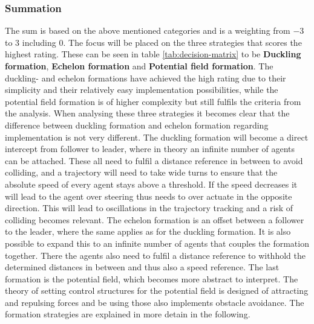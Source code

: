 \subsubsection{Summation}
The sum is based on the above mentioned categories and is a weighting from $-3$ to $3$ including $0$. The focus will be placed on the three strategies that scores the highest rating. These can be seen in table \ref{tab:decision-matrix} to be \textbf{Duckling formation}, \textbf{Echelon formation} and \textbf{Potential field formation}. The duckling- and echelon formations have achieved the high rating due to their simplicity and their relatively easy implementation possibilities, while the potential field formation is of higher complexity but still fulfils the criteria from the analysis. When analysing these three strategies it becomes clear that the difference between duckling formation and echelon formation regarding implementation is not very different. The duckling formation will become a direct intercept from follower to leader, where in theory an infinite number of agents can be attached. These all need to fulfil a distance reference in between to avoid colliding, and a trajectory will need to take wide turns to ensure that the absolute speed of every agent stays above a threshold. If the speed decreases it will lead to the agent over steering thus needs to over actuate in the opposite direction. This will lead to oscillations in the trajectory tracking and a risk of colliding becomes relevant. The echelon formation is an offset between a follower to the leader, where the same applies as for the duckling formation. It is also possible to expand this to an infinite number of agents that couples the formation together. There the agents also need to fulfil a distance reference to withhold the determined distances in between and thus also a speed reference. The last formation is the potential field, which becomes more abstract to interpret. The theory of setting control structures for the potential field is designed of attracting and repulsing forces and be using those also implements obstacle avoidance. The formation strategies are explained in more detain in the following.






